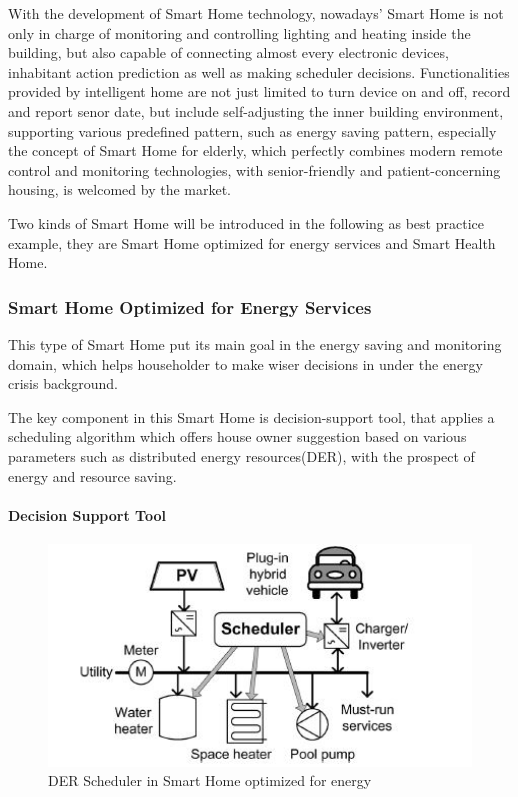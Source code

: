 \documentclass[]{llncs}
\begin{document}
With the development of Smart Home technology, nowadays' Smart Home is not only  in charge of monitoring and controlling lighting and heating inside the building, but also capable of connecting almost every electronic devices, inhabitant action prediction as well as making scheduler decisions. Functionalities provided by intelligent home are not just limited to turn device on and off, record and report senor date, but include self-adjusting the inner building environment, supporting various predefined pattern, such as energy saving pattern, especially the concept of Smart Home for elderly\cite{smart_home_for_old}, which perfectly combines modern remote control and monitoring technologies, with senior-friendly and patient-concerning housing, is welcomed by the market. 

Two kinds of Smart Home will be introduced in the following as best practice example, they are Smart Home optimized for energy services and Smart Health Home.
\subsubsection{Smart Home Optimized for Energy Services}
This type of Smart Home put its main goal in the energy saving and monitoring domain, which helps householder to make wiser decisions in under the energy crisis background. 

The key component in this Smart Home is decision-support tool\cite{smart_home_for_energy}, that applies a scheduling algorithm which offers house owner suggestion based on various parameters such as distributed energy resources(DER), with the prospect of energy and resource saving.

\paragraph{Decision Support Tool}

 \begin{figure}[!htbp]
	\centering
	\includegraphics[width=1.0\textwidth]{scheduler.jpg}
		\caption[ ]{DER Scheduler in Smart Home optimized for energy\cite{smart_home_for_energy}}
	\label{fig:smart-home-scheduler}
\end{figure}
\end{document}
